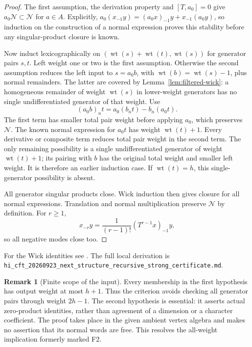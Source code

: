 \documentclass[11pt,a4paper]{article}
\theoremstyle{definition}
\newtheorem{remark}[theorem]{Remark}
\DeclareMathOperator{\wt}{wt}
\newcommand{\artifact}[1]{\textnormal{\nolinkurl{#1}}}
\begin{document}
\begin{proof}
The first assumption, the derivation property and \([T,a_0]=0\)
give \(a_0\mathcal N\subset\mathcal N\) for \(a\in A\).
Explicitly, $a_0(x_{-1}y)=(a_0x)_{-1}y+x_{-1}(a_0y)$, so
induction on the construction of a normal expression proves this
stability before any singular-product closure is known.

Now induct lexicographically on
\((\wt(s)+\wt(t),\wt(s))\) for generator pairs \(s,t\).
Left weight one or two is the first assumption. Otherwise the second
assumption reduces the left input to \(s=a_0b\), with
\(\wt(b)=\wt(s)-1\), plus normal remainders. The latter are covered
by Lemma~\ref{lem:filtered-wick}: a homogeneous remainder of weight
$\wt(s)$ in lower-weight generators has no single undifferentiated
generator of that weight. Use
\begin{equation}\label{eq:recursive-jacobi}
 (a_0b)_nt=a_0(b_nt)-b_n(a_0t).
\end{equation}
The first term has smaller total pair weight before applying \(a_0\),
which preserves \(\mathcal N\). The known normal expression for
\(a_0t\) has weight \(\wt(t)+1\). Every derivative or composite term
reduces total pair weight in the second term. The only remaining
possibility is a single undifferentiated generator of weight
\(\wt(t)+1\); its pairing with \(b\) has the original total weight
and smaller left weight. It is therefore an earlier induction case.
If \(\wt(t)=h\), this single-generator possibility is absent.

All generator singular products close. Wick induction then gives closure
for all normal expressions. Translation and normal multiplication
preserve \(\mathcal N\) by definition. For $r\geq1$,
\[
 x_{-r}y=\frac{1}{(r-1)!}(T^{r-1}x)_{-1}y,
\]
so all negative modes close too.
\end{proof}
For the Wick identities see \cite[Section 2]{DSK}.
The full local derivation is
\artifact{hi_cft_20260923_next_structure_recursive_strong_certificate.md}.

\begin{remark}[Finite scope of the input]\label{rem:finite-scope}
Every membership in the first hypothesis has output weight at most
$h+1$. Thus the criterion avoids checking all generator pairs through
weight $2h-1$. The second hypothesis is essential: it asserts actual
zero-product identities, rather than agreement of a dimension or a
character coefficient. The proof takes place in the given ambient
vertex algebra and makes no assertion that its normal words are free.
This resolves the all-weight implication formerly marked F2.
\end{remark}
\end{document}
